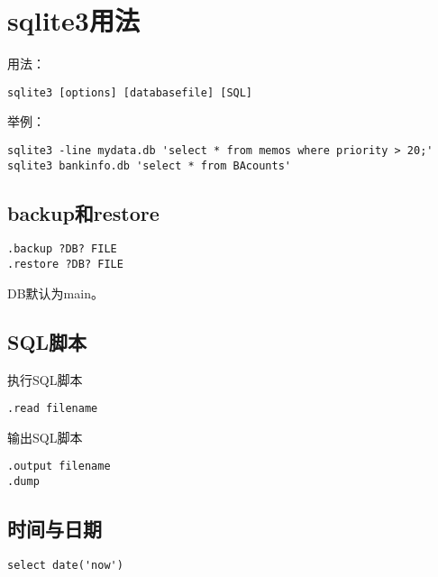\section{sqlite3用法}
用法：
\begin{verbatim}
sqlite3 [options] [databasefile] [SQL]
\end{verbatim}

举例：
\begin{verbatim}
sqlite3 -line mydata.db 'select * from memos where priority > 20;'
sqlite3 bankinfo.db 'select * from BAcounts'
\end{verbatim}

\subsection{backup和restore}
\begin{verbatim}
.backup ?DB? FILE
.restore ?DB? FILE 
\end{verbatim}
DB默认为main。

\subsection{SQL脚本}
执行SQL脚本
\begin{verbatim}
.read filename
\end{verbatim}

输出SQL脚本
\begin{verbatim}
.output filename 
.dump
\end{verbatim}

\subsection{时间与日期}

\begin{verbatim}
select date('now')
\end{verbatim}

